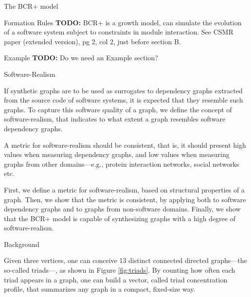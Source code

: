 \documentclass[11pt,twocolumn,a4paper,english]{article}
\newcommand{\TODO}{\textbf{TODO:} }
\begin{document}
\begin{section}{The BCR+ model}
\begin{subsection}{Formation Rules}
	\TODO BCR+ is a growth model, can simulate the evolution of a software system subject to constraints in module interaction. See CSMR paper (extended version), pg 2, col 2, just before section B. 
	
\end{subsection}

\begin{subsection}{Example}
	\TODO Do we need an Example section?
\end{subsection}
	
\end{section}


\begin{section}{Software-Realism}
	
	If synthetic graphs are to be used as surrogates to dependency graphs extracted from the source code of software systems, it is expected that they resemble such graphs. To capture this software quality of a graph, we define the concept of software-realism, that indicates to what extent a graph resembles software dependency graphs.
	
	A metric for software-realism should be consistent, that is, it should present high values when measuring dependency graphs, and low values when measuring graphs from other domains---e.g., protein interaction networks, social networks etc.
	
	First, we define a metric for software-realism, based on structural properties of a graph. Then, we show that the metric is consistent, by applying both to software dependency graphs and to graphs from non-software domains. Finally, we show that the BCR+ model is capable of synthesizing graphs with a high degree of software-realism.
	
\begin{subsection}{Background}

	Given three vertices, one can conceive 13 distinct connected directed graphs---the so-called triads---, as shown in Figure \ref{fig:triads}. By counting how often each triad appears in a graph, one can build a vector, called triad concentration profile, that summarizes any graph in a compact, fixed-size way.


\end{subsection}
\end{section}
\end{document}
